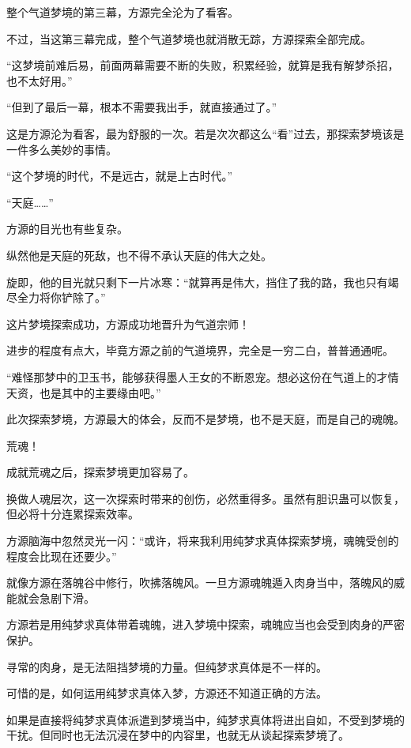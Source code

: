 
\begin{this_body}



整个气道梦境的第三幕，方源完全沦为了看客。

不过，当这第三幕完成，整个气道梦境也就消散无踪，方源探索全部完成。

“这梦境前难后易，前面两幕需要不断的失败，积累经验，就算是我有解梦杀招，也不太好用。”

“但到了最后一幕，根本不需要我出手，就直接通过了。”

这是方源沦为看客，最为舒服的一次。若是次次都这么“看”过去，那探索梦境该是一件多么美妙的事情。

“这个梦境的时代，不是远古，就是上古时代。”

“天庭……”

方源的目光也有些复杂。

纵然他是天庭的死敌，也不得不承认天庭的伟大之处。

旋即，他的目光就只剩下一片冰寒：“就算再是伟大，挡住了我的路，我也只有竭尽全力将你铲除了。”

这片梦境探索成功，方源成功地晋升为气道宗师！

进步的程度有点大，毕竟方源之前的气道境界，完全是一穷二白，普普通通呢。

“难怪那梦中的卫玉书，能够获得墨人王女的不断恩宠。想必这份在气道上的才情天资，也是其中的主要缘由吧。”

此次探索梦境，方源最大的体会，反而不是梦境，也不是天庭，而是自己的魂魄。

荒魂！

成就荒魂之后，探索梦境更加容易了。

换做人魂层次，这一次探索时带来的创伤，必然重得多。虽然有胆识蛊可以恢复，但必将十分连累探索效率。

方源脑海中忽然灵光一闪：“或许，将来我利用纯梦求真体探索梦境，魂魄受创的程度会比现在还要少。”

就像方源在落魄谷中修行，吹拂落魄风。一旦方源魂魄遁入肉身当中，落魄风的威能就会急剧下滑。

方源若是用纯梦求真体带着魂魄，进入梦境中探索，魂魄应当也会受到肉身的严密保护。

寻常的肉身，是无法阻挡梦境的力量。但纯梦求真体是不一样的。

可惜的是，如何运用纯梦求真体入梦，方源还不知道正确的方法。

如果是直接将纯梦求真体派遣到梦境当中，纯梦求真体将进出自如，不受到梦境的干扰。但同时也无法沉浸在梦中的内容里，也就无从谈起探索梦境了。


\end{this_body}
